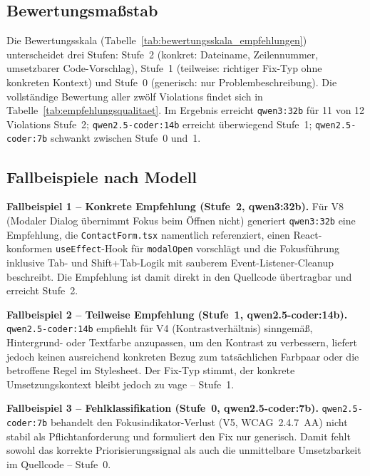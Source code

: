 \subsection{Bewertungsmaßstab}
\label{sec:fix_skala}

Die Bewertungsskala (Tabelle~\ref{tab:bewertungsskala_empfehlungen}) unterscheidet drei Stufen: Stufe~2 (konkret: Dateiname, Zeilennummer, umsetzbarer Code-Vorschlag), Stufe~1 (teilweise: richtiger Fix-Typ ohne konkreten Kontext) und Stufe~0 (generisch: nur Problembeschreibung). Die vollständige Bewertung aller zwölf Violations findet sich in Tabelle~\ref{tab:empfehlungsqualitaet}. Im Ergebnis erreicht \texttt{qwen3:32b} für 11 von 12 Violations Stufe~2; \texttt{qwen2.5-coder:14b} erreicht überwiegend Stufe~1; \texttt{qwen2.5-coder:7b} schwankt zwischen Stufe~0 und~1.

\subsection{Fallbeispiele nach Modell}
\label{sec:fix_fallbeispiele}

\textbf{Fallbeispiel 1 -- Konkrete Empfehlung (Stufe~2, qwen3:32b).}
Für V8 (Modaler Dialog übernimmt Fokus beim Öffnen nicht) generiert \texttt{qwen3:32b} eine Empfehlung, die \texttt{ContactForm.tsx} namentlich referenziert, einen React-konformen \texttt{useEffect}-Hook für \texttt{modalOpen} vorschlägt und die Fokusführung inklusive Tab- und Shift+Tab-Logik mit sauberem Event-Listener-Cleanup beschreibt. Die Empfehlung ist damit direkt in den Quellcode übertragbar und erreicht Stufe~2.

\textbf{Fallbeispiel 2 -- Teilweise Empfehlung (Stufe~1, qwen2.5-coder:14b).}
\texttt{qwen2.5-coder:14b} empfiehlt für V4 (Kontrastverhältnis) sinngemäß, Hintergrund- oder Textfarbe anzupassen, um den Kontrast zu verbessern, liefert jedoch keinen ausreichend konkreten Bezug zum tatsächlichen Farbpaar oder die betroffene Regel im Stylesheet. Der Fix-Typ stimmt, der konkrete Umsetzungskontext bleibt jedoch zu vage -- Stufe~1.

\textbf{Fallbeispiel 3 -- Fehlklassifikation (Stufe~0, qwen2.5-coder:7b).}
\texttt{qwen2.5-coder:7b} behandelt den Fokus\-indikator-Verlust (V5, \ac{WCAG}~2.4.7~AA) nicht stabil als Pflichtanforderung und formuliert den Fix nur generisch. Damit fehlt sowohl das korrekte Priorisierungssignal als auch die unmittelbare Umsetzbarkeit im Quellcode -- Stufe~0.

